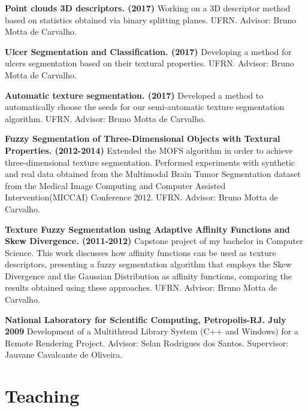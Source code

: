\documentclass[letterpaper]{article}
\renewenvironment{itemize}{
  \begin{list}{}{
      \setlength{\leftmargin}{1.5em}
    }
  }{
  \end{list}
}
\begin{document}
\begin{itemize}

  \item[$\bullet$] \textbf{Point clouds 3D descriptors. (2017)}
  Working on a 3D descriptor method based on statistics obtained via binary splitting planes.
  UFRN. Advisor: Bruno Motta de Carvalho.
  
  \item[$\bullet$] \textbf{Ulcer Segmentation and Classification. (2017)}
  Developing a method for ulcers segmentation based on their textural properties.
  UFRN. Advisor: Bruno Motta de Carvalho.

  \item[$\bullet$] \textbf{Automatic texture segmentation. (2017)}
  Developed a method to automatically  choose  the seeds for our semi-automatic texture segmentation algorithm.
  UFRN. Advisor: Bruno Motta de Carvalho.

  \item[$\bullet$] \textbf{Fuzzy Segmentation of Three-Dimensional Objects with Textural Properties. (2012-2014)}
  Extended the MOFS algorithm in order to achieve three-dimensional texture segmentation. Performed experiments with synthetic and real data obtained from the Multimodal Brain Tumor Segmentation dataset from the Medical Image Computing and Computer Assisted Intervention(MICCAI) Conference 2012.
  UFRN. Advisor: Bruno Motta de Carvalho.

  \item[$\bullet$] \textbf{Texture Fuzzy Segmentation using Adaptive Affinity Functions and Skew Divergence. (2011-2012)}
  Capstone project of my bachelor in Computer Science. This work discusses how affinity functions
  can be used as texture descriptors, presenting a fuzzy segmentation algorithm that employs the Skew
  Divergence and the Gaussian Distribution as affinity functions, comparing the results obtained using
  these approaches.
  UFRN. Advisor: Bruno Motta de Carvalho.
  
  \item[$\bullet$] \textbf{National Laboratory for Scientific Computing, Petropolis-RJ. July 2009}
  Development of a Multithread Library System (C++ and Windows) for a Remote Rendering Project. 
  Advisor: Selan Rodrigues dos Santos. Supervisor: Jauvane Cavalcante de Oliveira.
  
\end{itemize}

\section*{Teaching}
\end{document}
